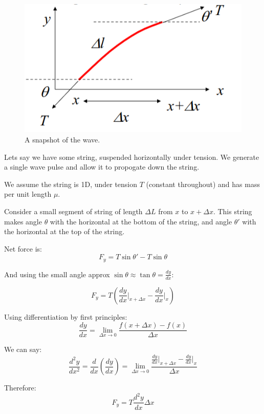 \begin{figure}[H]
    \centering
    \includegraphics{figures/lec03-02.png}
     \caption{A snapshot of the wave.}
\end{figure}


Lets say we have some string, suspended horizontally under tension. We generate a single wave pulse and allow it to propogate down the string.

We assume the string is 1D, under tension $T$ (constant throughout) and has mass per unit length $\mu$.

Consider a small segment of string of length $\Delta L$ from $x$ to $x + \Delta x$. This string makes angle $\theta$ with the horizontal at the bottom of the string, and angle $\theta'$ with the horizontal at the top of the string.

Net force is:
\[
    F_y = T \sin \theta' - T \sin \theta
\]

And using the small angle approx $\sin \theta \approx \tan \theta = \frac{dy}{dx}$:

\[
    F_y = T\left(\frac{dy}{dx} \Bigr\rvert_{x + \Delta x} - \frac{dy}{dx} \Bigr\rvert_{x}\right)
\]

Using differentiation by first principles:
\[
    \frac{dy}{dx} = \lim_{\Delta x \to 0} \frac{f(x + \Delta x) - f(x)}{\Delta x}
\]


We can say:
\[
    \frac{d^2y}{dx^2} = \frac{d}{dx}\left(\frac{dy}{dx}\right) = \lim_{\Delta x \to 0} \frac{\frac{dy}{dx} \Bigr\rvert_{x + \Delta x} - \frac{dy}{dx} \Bigr\rvert_{x}}{\Delta x}
\]

Therefore:
\[
    F_y = T \frac{d^2y}{dx} \Delta x
\]



